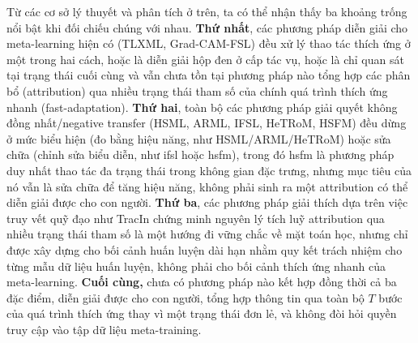 Từ các cơ sở lý thuyết và phân tích ở trên, ta có thể nhận thấy ba khoảng trống nổi bật khi đối chiếu chúng với nhau. \textbf{Thứ nhất}, các phương pháp diễn giải cho meta-learning hiện có (TLXML, Grad-CAM-FSL) đều xử lý thao tác thích ứng ở một trong hai cách, hoặc là diễn giải hộp đen ở cấp tác vụ, hoặc là chỉ quan sát tại trạng thái cuối cùng và vẫn chưa tồn tại phương pháp nào tổng hợp các phân bổ (attribution) qua nhiều trạng thái tham số của chính quá trình thích ứng nhanh (fast-adaptation). \textbf{Thứ hai}, toàn bộ các phương pháp giải quyết không đồng nhất/negative transfer (HSML, ARML, IFSL, HeTRoM, HSFM) đều dừng ở mức biểu hiện (đo bằng hiệu năng, như HSML/ARML/HeTRoM) hoặc sửa chữa (chỉnh sửa biểu diễn, như \acrshort{ifsl} hoặc \acrshort{hsfm}), trong đó \acrshort{hsfm} là phương pháp duy nhất thao tác đa trạng thái trong không gian đặc trưng, nhưng mục tiêu của nó vẫn là sửa chữa để tăng hiệu năng, không phải sinh ra một attribution có thể diễn giải được cho con người. \textbf{Thứ ba}, các phương pháp giải thích dựa trên việc truy vết quỹ đạo như TracIn chứng minh nguyên lý tích luỹ attribution qua nhiều trạng thái tham số là một hướng đi vững chắc về mặt toán học, nhưng chỉ được xây dựng cho bối cảnh huấn luyện dài hạn nhằm quy kết trách nhiệm cho từng mẫu dữ liệu huấn luyện, không phải cho bối cảnh thích ứng nhanh của meta-learning. \textbf{Cuối cùng,} chưa có phương pháp nào kết hợp đồng thời cả ba đặc điểm, diễn giải được cho con người, tổng hợp thông tin qua toàn bộ $T$ bước của quá trình thích ứng thay vì một trạng thái đơn lẻ, và không đòi hỏi quyền truy cập vào tập dữ liệu meta-training.








